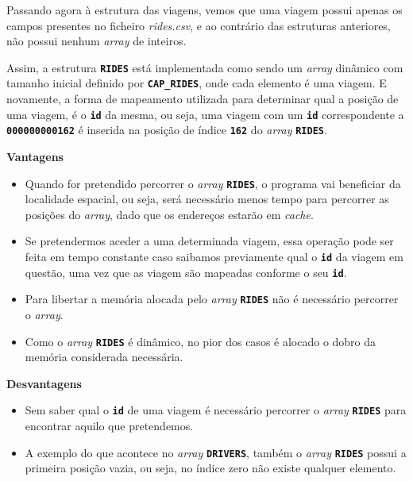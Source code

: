 \documentclass[12pt,a4paper]{report}
\begin{document}
Passando agora à estrutura das viagens, vemos que uma viagem possui apenas os campos presentes no ficheiro \textit{rides.csv}, e ao contrário das estruturas anteriores, não possui nenhum \textit{array} de inteiros.

Assim, a estrutura \textbf{\small\texttt{RIDES}} está implementada como sendo um \textit{array} dinâmico com tamanho inicial definido por \textbf{\small\texttt{CAP\_RIDES}}, onde cada elemento é uma viagem. E novamente, a forma de mapeamento utilizada para determinar qual a posição de uma viagem, é o \textbf{\small\texttt{id}} da mesma, ou seja, uma viagem com um \textbf{\small\texttt{id}} correspondente a \textbf{\small\texttt{000000000162}} é inserida na posição de índice \textbf{\small\texttt{162}} do \textit{array} \textbf{\small\texttt{RIDES}}.

\normalsize\textbf{Vantagens}
\begin{itemize}
   
    \item Quando for pretendido percorrer o \textit{array} \textbf{\small\texttt{RIDES}}, o programa vai beneficiar da localidade espacial, ou seja, será necessário menos tempo para percorrer as posições do \textit{array}, dado que os endereços estarão em \textit{cache}.
    
    \item Se pretendermos aceder a uma determinada viagem, essa operação pode ser feita em tempo constante caso saibamos previamente qual o \textbf{\small\texttt{id}} da viagem em questão, uma vez que as viagem são mapeadas conforme o seu \textbf{\small\texttt{id}}.

    \item Para libertar a memória alocada pelo \textit{array} \textbf{\small\texttt{RIDES}} não é necessário percorrer o \textit{array}.

    \item Como o \textit{array} \textbf{\small\texttt{RIDES}} é dinâmico, no pior dos casos é alocado o dobro da memória considerada necessária.
\end{itemize}

\pagebreak
\normalsize\textbf{Desvantagens}
\begin{itemize}
    \item Sem saber qual o \textbf{\small\texttt{id}} de uma viagem é necessário percorrer o \textit{array} \textbf{\small\texttt{RIDES}} para encontrar aquilo que pretendemos.
    
    \item A exemplo do que acontece no \textit{array} \textbf{\small\texttt{DRIVERS}}, também o \textit{array} \textbf{\small\texttt{RIDES}} possui a primeira posição vazia, ou seja, no índice zero não existe qualquer elemento.
\end{itemize}
\end{document}
